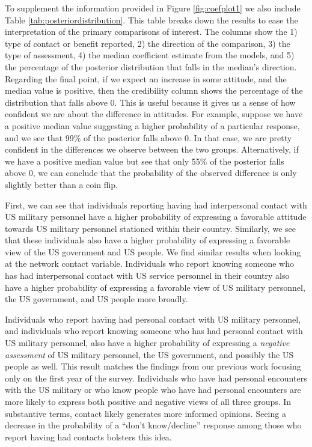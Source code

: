 To supplement the information provided in Figure \ref{fig:coefplot1} we also include Table \ref{tab:posteriordistribution}. This table breaks down the results to ease the interpretation of the primary comparisons of interest. The columns show the 1) type of contact or benefit reported, 2) the direction of the comparison, 3) the type of assessment, 4) the median coefficient estimate from the models, and 5) the percentage of the posterior distribution that falls in the median's direction. Regarding the final point, if we expect an increase in some attitude, and the median value is positive, then the credibility column shows the percentage of the distribution that falls above 0. This is useful because it gives us a sense of how confident we are about the difference in attitudes. For example, suppose we have a positive median value suggesting a higher probability of a particular response, and we see that 99\% of the posterior falls above 0. In that case, we are pretty confident in the differences we observe between the two groups. Alternatively, if we have a positive median value but see that only 55\% of the posterior falls above 0, we can conclude that the probability of the observed difference is only slightly better than a coin flip. 



First, we can see that individuals reporting having had interpersonal contact with US military personnel have a higher probability of expressing a favorable attitude towards US military personnel stationed within their country. Similarly, we see that these individuals also have a higher probability of expressing a favorable view of the US government and US people. We find similar results when looking at the network contact variable. Individuals who report knowing someone who has had interpersonal contact with US service personnel in their country also have a higher probability of expressing a favorable view of US military personnel, the US government, and US people more broadly. 

Individuals who report having had personal contact with US military personnel, and individuals who report knowing someone who has had personal contact with US military personnel, also have a higher probability of expressing a \textit{negative assessment} of US military personnel, the US government, and possibly the US people as well. This result matches the findings from our previous work focusing only on the first year of the survey.\cite[see]{Allen2020} Individuals who have had personal encounters with the US military or who know people who have had personal encounters are more likely to express both positive and negative views of all three groups. In substantive terms, contact likely generates more informed opinions. Seeing a decrease in the probability of a ``don't know/decline'' response among those who report having had contacts bolsters this idea. 

